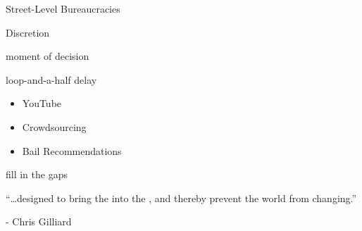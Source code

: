 \documentclass[aspectratio=43,17pt]{beamer} %
\begin{document}
\begin{frame}[standout]
Street-Level Bureaucracies
\end{frame}


\begin{frame}[standout]
Discretion
\end{frame}


\begin{frame}[standout]
moment of decision
\end{frame}



\begin{frame}[standout]
loop-and-a-half delay
\end{frame}



\begin{frame}[plain]
    
\begin{itemize}
  \item YouTube
  \item Crowdsourcing
  \item Bail Recommendations
\end{itemize}

\end{frame}


\begin{frame}[standout]
fill in the gaps
\end{frame}


\begin{frame}[plain]
\centering
``\dots designed to bring the  into the , and thereby {prevent} the world from changing.''

\hfill - Chris Gilliard
\end{frame}


\begin{frame}[plain]

\centering


\end{frame}


\begin{frame}[plain]

\centering


\end{frame}
\end{document}
